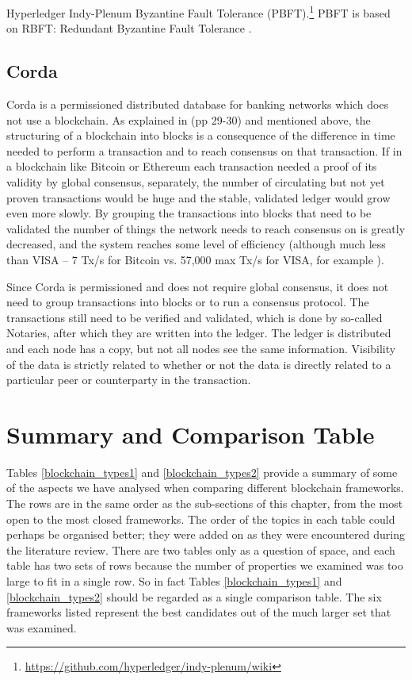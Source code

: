 Hyperledger Indy-Plenum Byzantine Fault Tolerance (PBFT).\footnote{\url{https://github.com/hyperledger/indy-plenum/wiki}} PBFT is based on RBFT: Redundant Byzantine Fault Tolerance
\cite{Aublinetal2013}.



\subsection{Corda}
Corda \cite{Hearn2016} is a permissioned distributed database for banking networks which does not use a blockchain. As explained  in \cite{Hearn2016} (pp 29-30) and mentioned above, the structuring of a blockchain into blocks is a consequence of the difference in time needed to perform a transaction and to reach consensus on that transaction. If in a blockchain like Bitcoin or Ethereum each transaction needed a proof of its validity by global consensus, separately, the number of circulating but not yet proven transactions would be huge and the stable, validated ledger would grow even more slowly. By grouping the transactions into blocks that need to be validated the number of things the network needs to reach consensus on is greatly decreased, and the system reaches some level of efficiency (although much less than VISA -- 7 Tx/s for Bitcoin vs. 57,000 max Tx/s for VISA, for example \cite{Antonopoulos2015}).

Since Corda is permissioned and does not require global consensus, it does not need to group transactions into blocks or to run a consensus protocol. The transactions still need to be verified and validated, which is done by so-called Notaries, after which they are written into the ledger. The ledger is distributed and each node has a copy, but not all nodes see the same information. Visibility of the data is strictly related to whether or not the data is directly related to a particular peer or counterparty in the transaction.

\section{Summary and Comparison Table}
Tables \ref{blockchain_types1} and \ref{blockchain_types2} provide a summary of some of the aspects we have analysed when comparing different blockchain frameworks. The rows are in the same order as the sub-sections of this chapter, from the most open to the most closed frameworks. The order of the topics in each table could perhaps be organised better; they were added on as they were encountered during the literature review. There are two tables only as a question of space, and each table has two sets of rows because the number of properties we examined was too large to fit in a single row. So in fact Tables \ref{blockchain_types1} and \ref{blockchain_types2} should be regarded as a single comparison table. The six frameworks listed represent the best candidates out of the much larger set that was examined.

